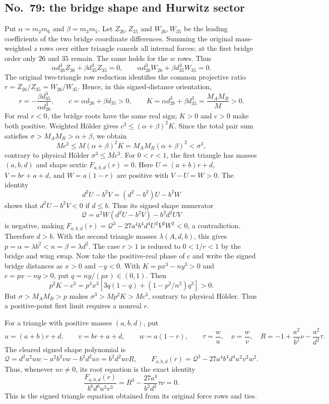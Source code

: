 \documentclass[11pt]{amsart}
\theoremstyle{remark}
\begin{document}
\subsection{No.~79: the bridge shape and Hurwitz sector}\label{sec:no79-sector}
Put $\alpha=m_2m_6$ and $\beta=m_3m_5$. Let $Z_{26},Z_{35}$ and $W_{26},W_{35}$ be the leading coefficients of the two bridge coordinate differences. Summing the original mass-weighted $z$ rows over either triangle cancels all internal forces; at the first bridge order only $26$ and $35$ remain. The same holds for the $w$ rows. Thus
\[
\alpha d_{26}^{3}Z_{26}+\beta d_{35}^{3}Z_{35}=0,
\qquad
\alpha d_{26}^{3}W_{26}+\beta d_{35}^{3}W_{35}=0.
\]
The original two-triangle row reduction identifies the common projective ratio $r=Z_{26}/Z_{35}=W_{26}/W_{35}$. Hence, in this signed-distance orientation,
\[
r=-\frac{\beta d_{35}^{3}}{\alpha d_{26}^{3}},\qquad
c=\alpha d_{26}+\beta d_{35}>0,\qquad
K=\alpha d_{26}^{3}+\beta d_{35}^{3}=\frac{M_AM_B}{M}>0.
\]
For real $r<0$, the bridge roots have the same real sign; $K>0$ and $c>0$ make both positive. Weighted H\"older gives $c^3\le(\alpha+\beta)^2K$. Since the total pair sum satisfies $\sigma>M_AM_B>\alpha+\beta$, we obtain
\[
Mc^3\le M(\alpha+\beta)^2K=M_AM_B(\alpha+\beta)^2<\sigma^3,
\]
contrary to physical H\"older $\sigma^3\le Mc^3$. For $0<r<1$, the first triangle has masses $(a,b,d)$ and shape sextic $F_{a,b,d}(r)=0$. Here $U=(a+b)r+d$, $V=br+a+d$, and $W=a(1-r)$ are positive with $V-U=W>0$. The identity
\[
d^2U-b^2V=(d^2-b^2)U-b^2W
\]
shows that $d^2U-b^2V<0$ if $d\le b$. Thus its signed shape numerator
\[
\mathcal Q=a^2W(d^2U-b^2V)-b^2d^2UV
\]
is negative, making $F_{a,b,d}(r)=\mathcal Q^3-27a^4b^4d^4U^2V^2W^2<0$, a contradiction. Therefore $d>b$. With the second triangle masses $\lambda(A,d,b)$, this gives $p=\alpha=\lambda b^2<n=\beta=\lambda d^2$. The case $r>1$ is reduced to $0<1/r<1$ by the bridge and wing swap. Now take the positive-real phase of $c$ and write the signed bridge distances as $x>0$ and $-y<0$. With $K=px^3-ny^3>0$ and $c=px-ny>0$, put $q=ny/(px)\in(0,1)$. Then
\begin{equation}\label{eq:no79-bridge-cubic-gap}
p^2K-c^3=p^3x^3\left[3q(1-q)+(1-p^2/n^2)q^3\right]>0.
\end{equation}
But $\sigma>M_AM_B>p$ makes $\sigma^3>Mp^2K>Mc^3$, contrary to physical H\"older. Thus a positive-point first limit requires a nonreal $r$.

For a triangle with positive masses $(a,b,d)$, put
\[
u=(a+b)r+d,\qquad v=br+a+d,\qquad w=a(1-r),\qquad
\tau=\frac wu,\quad \nu=\frac wv,\quad
R=-1+\frac{a^2}{b^2}\nu-\frac{a^2}{d^2}\tau.
\]
The cleared signed shape polynomial is
\[
\mathcal Q=d^2a^2uw-a^2b^2vw-b^2d^2uv=b^2d^2uvR,\qquad
F_{a,b,d}(r)=\mathcal Q^3-27a^4b^4d^4u^2v^2w^2.
\]
Thus, whenever $uv\ne0$, its root equation is the exact identity
\begin{equation}\label{eq:no79-triangle-sextic}
\frac{F_{a,b,d}(r)}{b^6d^6u^3v^3}
=R^3-\frac{27a^4}{b^2d^2}\tau\nu=0.
\end{equation}
This is the signed triangle equation obtained from its original force rows and ties.
\end{document}
